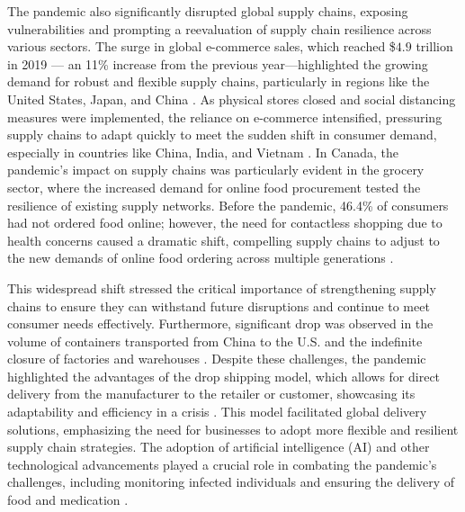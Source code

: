 The pandemic also significantly disrupted global supply chains, exposing vulnerabilities and prompting a reevaluation of supply chain resilience across various sectors. The surge in global e-commerce sales, which reached \$$4.9$ trillion in 2019 — an 11\% increase from the previous year—highlighted the growing demand for robust and flexible supply chains, particularly in regions like the United States, Japan, and China \parencite{KofiMensah2021Cross-BorderReview}. As physical stores closed and social distancing measures were implemented, the reliance on e-commerce intensified, pressuring supply chains to adapt quickly to meet the sudden shift in consumer demand, especially in countries like China, India, and Vietnam \parencite{KofiMensah2021Cross-BorderReview}. In Canada, the pandemic's impact on supply chains was particularly evident in the grocery sector, where the increased demand for online food procurement tested the resilience of existing supply networks. Before the pandemic, 46.4\% of consumers had not ordered food online; however, the need for contactless shopping due to health concerns caused a dramatic shift, compelling supply chains to adjust to the new demands of online food ordering across multiple generations \parencite{Charlebois2021SupplyStudy}. 

This widespread shift stressed the critical importance of strengthening supply chains to ensure they can withstand future disruptions and continue to meet consumer needs effectively. Furthermore, significant drop was observed in the volume of containers transported from China to the U.S. and the indefinite closure of factories and warehouses \parencite{Miljenovic2022PandemicsPandemic}. Despite these challenges, the pandemic highlighted the advantages of the drop shipping model, which allows for direct delivery from the manufacturer to the retailer or customer, showcasing its adaptability and efficiency in a crisis \parencite{Miljenovic2022PandemicsPandemic}. This model facilitated global delivery solutions, emphasizing the need for businesses to adopt more flexible and resilient supply chain strategies. The adoption of artificial intelligence (AI) and other technological advancements played a crucial role in combating the pandemic's challenges, including monitoring infected individuals and ensuring the delivery of food and medication \parencite{KofiMensah2021Cross-BorderReview}. 

